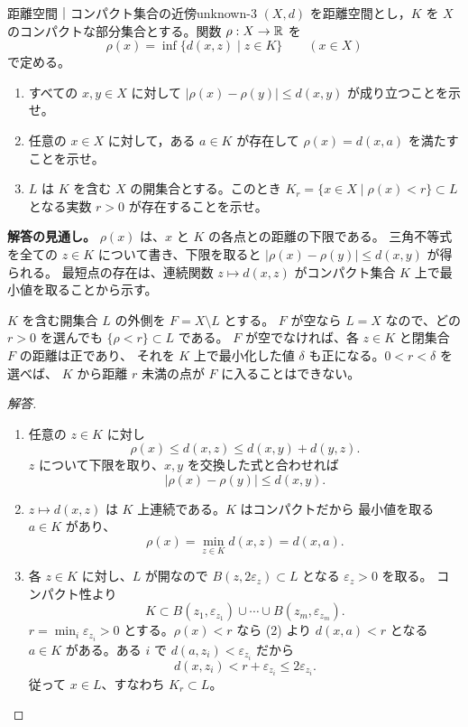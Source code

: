 \begin{problem}{距離空間｜コンパクト集合の近傍}{unknown-3}
$(X,d)$ を距離空間とし，$K$ を $X$ のコンパクトな部分集合とする。関数 $\rho:X\to\mathbb{R}$ を
\[
\rho(x)=\inf\{d(x,z)\mid z\in K\}\qquad(x\in X)
\]
で定める。
\begin{enumerate}
  \item[(1)] すべての $x,y\in X$ に対して $|\rho(x)-\rho(y)|\le d(x,y)$ が成り立つことを示せ。
  \item[(2)] 任意の $x\in X$ に対して，ある $a\in K$ が存在して $\rho(x)=d(x,a)$ を満たすことを示せ。
  \item[(3)] $L$ は $K$ を含む $X$ の開集合とする。このとき $K_r=\{x\in X\mid\rho(x)<r\}\subset L$ となる実数 $r>0$ が存在することを示せ。
\end{enumerate}
\end{problem}
\begin{memo*}
\textbf{解答の見通し。}
$\rho(x)$ は、$x$ と $K$ の各点との距離の下限である。
三角不等式を全ての $z\in K$ について書き、下限を取ると
$|\rho(x)-\rho(y)|\le d(x,y)$ が得られる。
最短点の存在は、連続関数 $z\mapsto d(x,z)$ がコンパクト集合 $K$ 上で最小値を取ることから示す。

$K$ を含む開集合 $L$ の外側を $F=X\setminus L$ とする。
$F$ が空なら $L=X$ なので、どの $r>0$ を選んでも $\{\rho<r\}\subset L$ である。
$F$ が空でなければ、各 $z\in K$ と閉集合 $F$ の距離は正であり、
それを $K$ 上で最小化した値 $\delta$ も正になる。$0<r<\delta$ を選べば、
$K$ から距離 $r$ 未満の点が $F$ に入ることはできない。
\end{memo*}
\begin{proof}[解答]
\begin{enumerate}
  \item[(1)] 任意の $z\in K$ に対し
  \[
  \rho(x)\le d(x,z)\le d(x,y)+d(y,z).
  \]
  $z$ について下限を取り、$x,y$ を交換した式と合わせれば
  \[
  |\rho(x)-\rho(y)|\le d(x,y).
  \]

  \item[(2)] $z\mapsto d(x,z)$ は $K$ 上連続である。$K$ はコンパクトだから
  最小値を取る $a\in K$ があり、
  \[
  \rho(x)=\min_{z\in K}d(x,z)=d(x,a).
  \]

  \item[(3)] 各 $z\in K$ に対し、$L$ が開なので
  $B(z,2\varepsilon_z)\subset L$ となる $\varepsilon_z>0$ を取る。
  コンパクト性より
  \[
  K\subset B(z_1,\varepsilon_{z_1})\cup\cdots\cup
  B(z_m,\varepsilon_{z_m}).
  \]
  $r=\min_i\varepsilon_{z_i}>0$ とする。$\rho(x)<r$ なら (2) より
  $d(x,a)<r$ となる $a\in K$ がある。ある $i$ で
  $d(a,z_i)<\varepsilon_{z_i}$ だから
  \[
  d(x,z_i)<r+\varepsilon_{z_i}\le2\varepsilon_{z_i}.
  \]
  従って $x\in L$、すなわち $K_r\subset L$。
\end{enumerate}
\end{proof}

